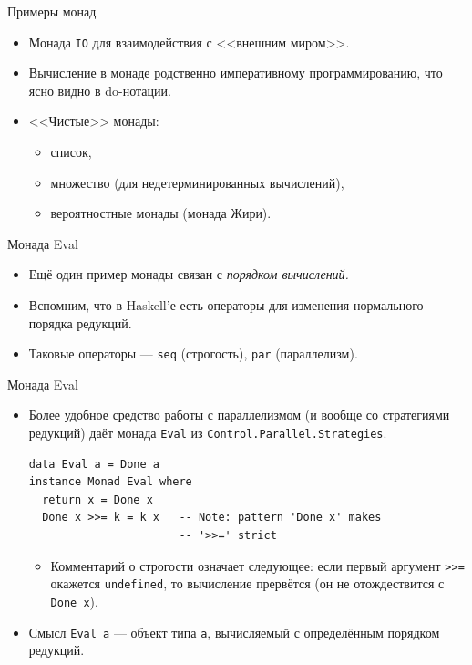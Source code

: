 \documentclass[xcolor=dvipsnames]{beamer}
\begin{document}
\begin{frame}{Примеры монад}
 
 \begin{itemize}[<+->]
  \item Монада \texttt{IO} для взаимодействия с <<внешним миром>>.
  \item Вычисление в монаде родственно императивному программированию, что ясно видно в do-нотации.
  \item {<<}Чистые>> монады:
  \begin{itemize}
  \item список,
  \item множество (для недетерминированных вычислений),
  \item вероятностные монады (монада Жири).
  \end{itemize}
 \end{itemize}

\end{frame}



\begin{frame}{Монада Eval}
 
 \begin{itemize}[<+->]
  \item Ещё один пример монады связан с {\em порядком вычислений.}
  \item Вспомним, что в Haskell'е есть операторы для изменения нормального порядка редукций.
  \item Таковые операторы --- {\tt seq} (строгость), {\tt par} (параллелизм).
 \end{itemize}

\end{frame}



\begin{frame}[fragile]{Монада Eval}
 
 \begin{itemize}[<+->]
  \item Более удобное средство работы с параллелизмом (и вообще со стратегиями редукций) даёт монада {\tt Eval} из {\tt Control.Parallel.Strategies}.
\begin{verbatim}
data Eval a = Done a
instance Monad Eval where
  return x = Done x
  Done x >>= k = k x   -- Note: pattern 'Done x' makes 
                       -- '>>=' strict
\end{verbatim}

\begin{itemize}
\item Комментарий о строгости означает следующее: если первый аргумент \texttt{>>=} окажется \texttt{undefined}, то вычисление прервётся (он не отождествится с \texttt{Done x}).
\end{itemize}
\item Смысл \texttt{Eval a} --- объект типа {\tt a}, вычисляемый с определённым порядком редукций.
 \end{itemize}

\end{frame}
\end{document}
